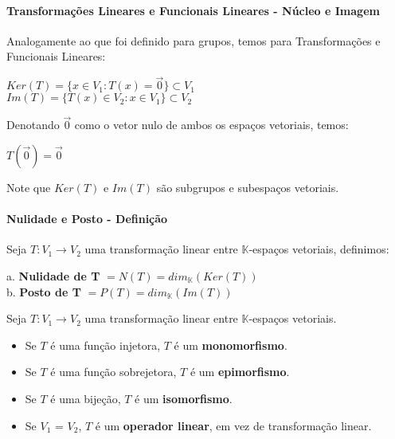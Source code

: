 \documentclass[12pt]{article}
\begin{document}
\paragraph{Transformações Lineares e Funcionais Lineares - Núcleo e Imagem\\}
	Analogamente ao que foi definido para grupos, temos para Transformações e Funcionais Lineares:
	\begin{center}
		$Ker(T) = \lbrace x \in V_1: T(x) = \overrightarrow{0} \rbrace \subset V_1$ \\[5pt]
		$Im(T) = \lbrace T(x) \in V_2: x \in V_1 \rbrace \subset V_2$
	\end{center}
	Denotando $\overrightarrow{0}$ como o vetor nulo de ambos os espaços vetoriais, temos:
	\begin{center}
		$T(\overrightarrow{0}) = \overrightarrow{0}$
	\end{center}
	Note que $Ker(T)$ e $Im(T)$ são subgrupos e subespaços vetoriais.

\paragraph{Nulidade e Posto - Definição\\}
	Seja $T: V_1 \rightarrow V_2$ uma transformação linear entre $\mathbb{K}$-espaços vetoriais, definimos:
	\begin{center}
		a. \textbf{Nulidade de T} $= N(T) = dim_{\mathbb{K}}(Ker(T))$ \\
		b. \textbf{Posto de T} $= P(T) = dim_{\mathbb{K}}(Im(T))$
	\end{center}
	Seja $T: V_1 \rightarrow V_2$ uma transformação linear entre $\mathbb{K}$-espaços vetoriais.
	\begin{itemize}
		\item Se $T$ é uma função injetora, $T$ é um \textbf{monomorfismo}.
		\item Se $T$ é uma função sobrejetora, $T$ é um \textbf{epimorfismo}.
		\item Se $T$ é uma bijeção, $T$ é um \textbf{isomorfismo}.
		\item Se $V_1$ = $V_2$, $T$ é um \textbf{operador linear}, em vez de transformação linear.
	\end{itemize}

\newpage
\end{document}
